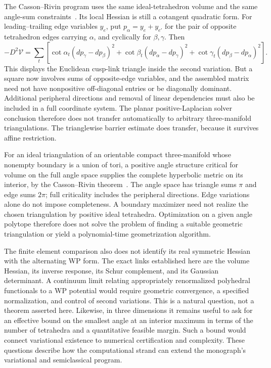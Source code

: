 The Casson--Rivin program uses the same ideal-tetrahedron volume and the
same angle-sum constraints~\cite{FuterGueritaud}. Its local Hessian is
still a cotangent quadratic form. For leading--trailing edge variables
$y_e$, put $p_\alpha=y_e+y_{e'}$ for the pair of opposite tetrahedron
edges carrying $\alpha$, and cyclically for $\beta,\gamma$. Then
\begin{equation}
 -D^2\mathcal V
 =\sum_t\left[
 \cot\alpha_t(dp_\gamma-dp_\beta)^2
 +\cot\beta_t(dp_\alpha-dp_\gamma)^2
 +\cot\gamma_t(dp_\beta-dp_\alpha)^2\right].
 \label{eq:ipolyThreeDimensionalHessian}
\end{equation}
This displays the Euclidean cusp-link triangle inside the second
variation. But a square now involves sums of opposite-edge variables,
and the assembled matrix need not have nonpositive off-diagonal entries
or be diagonally dominant. Additional peripheral directions and removal
of linear dependencies must also be included in a full coordinate
system. The planar positive-Laplacian solver conclusion therefore does
not transfer automatically to arbitrary three-manifold triangulations.
The trianglewise barrier estimate does transfer, because it survives
affine restriction.

For an ideal triangulation of an orientable compact three-manifold whose
nonempty boundary is a union of tori, a positive angle structure critical
for volume on the full angle space supplies the complete hyperbolic
metric on its interior, by the Casson--Rivin
theorem~\cite[Theorem~1.2]{FuterGueritaud}. The angle space has triangle
sums $\pi$ and edge sums $2\pi$; full criticality includes the peripheral
directions. Edge variations alone do not impose completeness.
A boundary maximizer need not realize the
chosen triangulation by positive ideal tetrahedra. Optimization on a
given angle polytope therefore does not solve the problem of finding
a suitable geometric triangulation or yield a polynomial-time
geometrization algorithm.

The finite element comparison also does not identify its real symmetric
Hessian with the alternating WP form. The exact links established here
are the volume Hessian, its inverse response, its Schur complement,
and its Gaussian determinant. A continuum limit relating appropriately
renormalized polyhedral functionals to a WP potential would require
geometric convergence, a specified normalization, and control of second
variations. This is a natural question, not a theorem asserted here.
Likewise, in three dimensions it remains useful to ask for an effective
bound on the smallest angle at an interior maximum in terms of the
number of tetrahedra and a quantitative feasible margin. Such a bound
would connect variational existence to numerical certification and
complexity. These questions describe how the computational strand can
extend the monograph's variational and semiclassical program.


